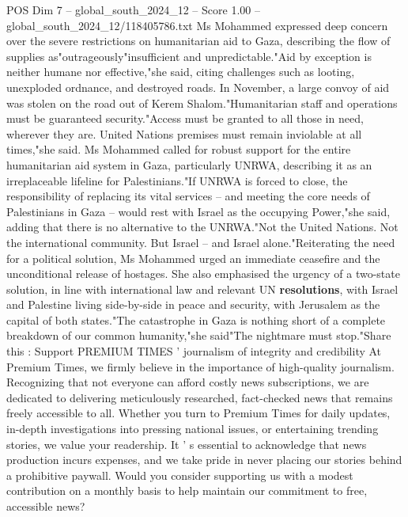 \begin{textsample}{POS Dim 7 – global\_south\_2024\_12 – Score 1.00 – global\_south\_2024\_12/118405786.txt}
Ms Mohammed expressed deep concern over the severe restrictions on humanitarian aid to Gaza, describing the flow of supplies as"outrageously"insufficient and unpredictable."Aid by exception is neither humane nor effective,"she said, citing challenges such as looting, unexploded ordnance, and destroyed roads.
In November, a large convoy of aid was stolen on the road out of Kerem Shalom."Humanitarian staff and operations must be guaranteed security."Access must be granted to all those in need, wherever they are.
United Nations premises must remain inviolable at all times,"she said.
Ms Mohammed called for robust support for the entire humanitarian aid system in Gaza, particularly UNRWA, describing it as an irreplaceable lifeline for Palestinians."If UNRWA is forced to close, the responsibility of replacing its vital services -- and meeting the core needs of Palestinians in Gaza -- would rest with Israel as the occupying Power,"she said, adding that there is no alternative to the UNRWA."Not the United Nations.
Not the international community.
But Israel -- and Israel alone."Reiterating the need for a political solution, Ms Mohammed urged an immediate ceasefire and the unconditional release of hostages.
She also emphasised the urgency of a two-state solution, in line with international law and relevant UN \textbf{resolutions}, with Israel and Palestine living side-by-side in peace and security, with Jerusalem as the capital of both states."The catastrophe in Gaza is nothing short of a complete breakdown of our common humanity,"she said"The nightmare must stop."Share this : Support PREMIUM TIMES ' journalism of integrity and credibility At Premium Times, we firmly believe in the importance of high-quality journalism.
Recognizing that not everyone can afford costly news subscriptions, we are dedicated to delivering meticulously researched, fact-checked news that remains freely accessible to all.
Whether you turn to Premium Times for daily updates, in-depth investigations into pressing national issues, or entertaining trending stories, we value your readership.
It ' s essential to acknowledge that news production incurs expenses, and we take pride in never placing our stories behind a prohibitive paywall.
Would you consider supporting us with a modest contribution on a monthly basis to help maintain our commitment to free, accessible news?

\end{textsample}
